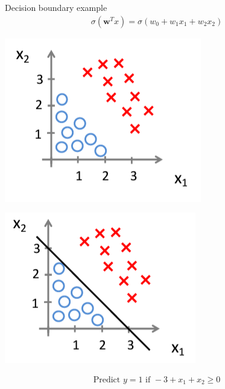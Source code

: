 \documentclass[serif, aspectratio=169]{beamer}
\begin{document}
\begin{frame}{Decision boundary example}
    \begin{align*}
        \sigma (\mathbf{w}^Tx) = \sigma (w_0 + w_1 x_1 + w_2 x_2)
    \end{align*}
    
    \begin{minipage}{0.35\linewidth}
        \centering
        \includegraphics[width=\linewidth]{pic/lrDB1.png}
    \end{minipage}
    \hfill
    \begin{minipage}{0.35\linewidth}
        \centering
        \includegraphics[width=\linewidth]{pic/lrDB2.png}
    \end{minipage}
    
    \begin{align*}
        \text{Predict } y=1 \text{ if } -3 + x_1 + x_2 \geq 0
    \end{align*}
    
\end{frame}
\end{document}
